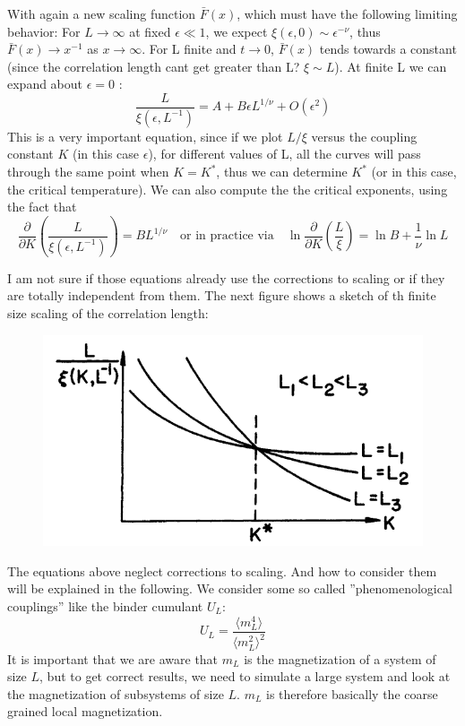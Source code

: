 	With again a new scaling function $\bar{F}(x)$, which must have the following limiting behavior: For $L \rightarrow \infty$ at fixed $\epsilon \ll 1$, we expect $\xi(\epsilon, 0) \sim \epsilon^{-\nu}$, thus $\bar{F}(x) \rightarrow x^{-1} $ as $x \rightarrow \infty$. For L finite and $t \rightarrow 0$, $\bar{F}(x)$ tends towards a constant (since the correlation length cant get greater than L? $\xi \sim L$). At finite L we can expand about $\epsilon =0$ \cite{pelissetto2002critical} \cite{goldenfeld2018lectures}:
	\begin{equation}
		\frac{L}{\xi(\epsilon, L^{-1})} =	A + B \epsilon L^{1/\nu} + O(\epsilon^2)
	\end{equation}
	This is a very important equation, since if we plot $L/\xi$ versus the coupling constant $K$ (in this case $\epsilon$), for different values of L, all the curves will pass through the same point when $K =	K^*$, thus we can determine $K^*$ (or in this case, the critical temperature). We can also compute the the critical exponents, using the fact that
	\begin{equation}
		\frac{\partial}{\partial K} \left(\frac{L}{\xi(\epsilon, L^{-1})}\right) = B L^{1/\nu} \quad \text{or in practice via} \quad \ln \frac{\partial}{\partial K}\left(\frac{L}{\xi}\right) =	\ln B + \frac{1}{\nu} \ln L
	\end{equation}
	
	I am not sure if those equations already use the corrections to scaling or if they are totally independent from them. The next figure shows a sketch of th finite size scaling of the correlation length:
	
	\begin{figure}[htp]
		\centering
		\includegraphics[width=12cm]{graphics/corr-ffs.png}
	\end{figure}
	
	The equations above neglect corrections to scaling. And how to consider them will be explained in the following. We consider some so called ''phenomenological couplings'' like the binder cumulant $U_L$:
	\begin{equation}
		U_L =	\frac{\langle m_L^4 \rangle}{\langle m_L^2 \rangle^2}
	\end{equation}
	It is important that we are aware that $m_L$ is the magnetization of a system of size $L$, but to get correct results, we need to simulate a large system and look at the magnetization of subsystems of size $L$. $m_L$ is therefore basically the coarse grained local magnetization.
	
